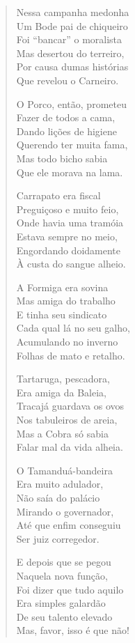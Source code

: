 \begin{verse}
Nessa campanha medonha\\
Um Bode pai de chiqueiro\\
Foi “bancar” o moralista\\
Mas desertou do terreiro,\\
Por causa dumas histórias\\
Que revelou o Carneiro.

O Porco, então, prometeu\\
Fazer de todos a cama,\\
Dando lições de higiene\\
Querendo ter muita fama,\\
Mas todo bicho sabia\\
Que ele morava na lama.

Carrapato era fiscal\\
Preguiçoso e muito feio,\\
Onde havia uma tramóia\\
Estava sempre no meio,\\
Engordando doidamente\\
À custa do sangue alheio.

A Formiga era sovina\\
Mas amiga do trabalho\\
E tinha seu sindicato\\
Cada qual lá no seu galho,\\
Acumulando no inverno\\
Folhas de mato e retalho.


Tartaruga, pescadora,\\
Era amiga da Baleia,\\
Tracajá guardava os ovos\\
Nos tabuleiros de areia,\\
Mas a Cobra só sabia\\
Falar mal da vida alheia.

O Tamanduá-bandeira\\
Era muito adulador,\\
Não saía do palácio\\
Mirando o governador,\\
Até que enfim conseguiu\\
Ser juiz corregedor.

E depois que se pegou\\
Naquela nova função,\\
Foi dizer que tudo aquilo\\
Era simples galardão\\
De seu talento elevado\\
Mas, favor, isso é que não!


\end{verse}
